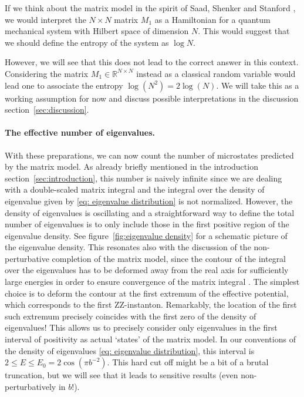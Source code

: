 \documentclass[12pt,a4paper]{article}
\newcommand\RR{\mathbb{R}}
\renewcommand{\le}{\leqslant}
\begin{document}
If we think about the matrix model in the spirit of Saad, Shenker and Stanford \cite{Saad:2019lba}, we would interpret the $N \times N$ matrix $M_1$ as a Hamiltonian for a quantum mechanical system with Hilbert space of dimension $N$. This would suggest that we should define the entropy of the system as $\log N$.

However, we will see that this does not lead to the correct answer in this context. Considering the matrix $M_1\in \RR^{N\times N}$ instead as a classical random variable would lead one to associate the entropy $\log (N^2)=2 \log(N)$. We will take this as a working assumption for now and discuss possible interpretations in the discussion section~\ref{sec:discussion}.

\paragraph{The effective number of eigenvalues.} With these preparations, we can now count the number of microstates predicted by the matrix model. As already briefly mentioned in the introduction section~\ref{sec:introduction}, this number is naively infinite since we are dealing with a double-scaled matrix integral and the integral over the density of eigenvalue given by \eqref{eq: eigenvalue distribution} is not normalized. However, the density of eigenvalues is oscillating and a straightforward way to define the total number of eigenvalues is to only include those in the first positive region of the eigenvalue density. See figure~\ref{fig:eigenvalue density} for a schematic picture of the eigenvalue density. This resonates also with the discussion of the non-perturbative completion of the matrix model, since the contour of the integral over the eigenvalues has to be deformed away from the real axis for sufficiently large energies in order to ensure convergence of the matrix integral \cite{paper3}. The simplest choice is to deform the contour at the first extremum of the effective potential, which corresponds to the first ZZ-instanton. Remarkably, the location of the first such extremum precisely coincides with the first zero of the density of eigenvalues! This allows us to precisely consider only eigenvalues in the first interval of positivity as actual `states' of the matrix model. In our conventions of the density of eigenvalues \eqref{eq: eigenvalue distribution}, this interval is $2\le E \le E_0=2 \cos(\pi b^{-2})$.
 This hard cut off might be a bit of a brutal truncation, but we will see that it leads to sensitive results (even non-perturbatively in $b$!).
\end{document}
